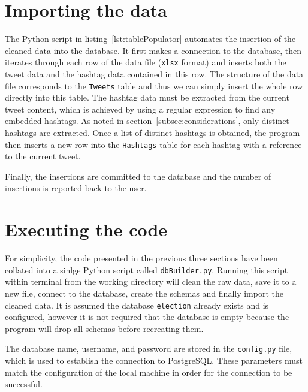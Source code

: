 \documentclass[a4paper, 12pt]{report}
\begin{document}

\label{lst:dataCleaner}

\section{Importing the data}
\label{sec:dataImporting}

The Python script in listing~\ref{lst:tablePopulator} automates the insertion of the cleaned data into the database. It first makes a connection to the database, then iterates through each row of the data file (\texttt{xlsx} format) and inserts both the tweet data and the hashtag data contained in this row. The structure of the data file corresponds to the \texttt{Tweets} table and thus we can simply insert the whole row directly into this table. The hashtag data must be extracted from the current tweet content, which is achieved by using a regular expression to find any embedded hashtags. As noted in section~\ref{subsec:considerations}, only distinct hashtags are extracted. Once a list of distinct hashtags is obtained, the program then inserts a new row into the \texttt{Hashtags} table for each hashtag with a reference to the current tweet.

Finally, the insertions are committed to the database and the number of insertions is reported back to the user.


\label{lst:tablePopulator}

\section{Executing the code}

For simplicity, the code presented in the previous three sections have been collated into a sinlge Python script called \texttt{dbBuilder.py}. Running this script within terminal from the working directory will clean the raw data, save it to a new file, connect to the database, create the schemas and finally import the cleaned data. It is assumed the database \texttt{election} already exists and is configured, however it is not required that the database is empty because the program will drop all schemas before recreating them.

The database name, username, and password are stored in the \texttt{config.py} file, which is used to establish the connection to PostgreSQL. These parameters must match the configuration of the local machine in order for the connection to be successful.
\end{document}
